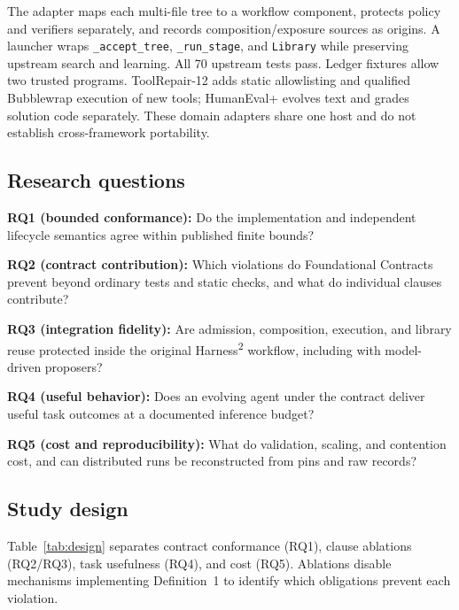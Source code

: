 \documentclass[letterpaper,journal]{IEEEtran}
\newcommand{\harness}{Harness\textsuperscript{2}}
\begin{document}
The adapter maps each multi-file tree to a workflow component, protects policy and verifiers separately, and records composition/exposure sources as origins. A launcher wraps \texttt{\_accept\_tree}, \texttt{\_run\_stage}, and \texttt{Library} while preserving upstream search and learning. All 70 upstream tests pass. Ledger fixtures allow two trusted programs. ToolRepair-12 adds static allowlisting and qualified Bubblewrap execution of new tools; HumanEval+ evolves text and grades solution code separately. These domain adapters share one host and do not establish cross-framework portability.

\subsection{Research questions}
\textbf{RQ1 (bounded conformance):} Do the implementation and independent lifecycle semantics agree within published finite bounds?
\par\noindent\textbf{RQ2 (contract contribution):} Which violations do Foundational Contracts prevent beyond ordinary tests and static checks, and what do individual clauses contribute?
\par\noindent\textbf{RQ3 (integration fidelity):} Are admission, composition, execution, and library reuse protected inside the original \harness{} workflow, including with model-driven proposers?
\par\noindent\textbf{RQ4 (useful behavior):} Does an evolving agent under the contract deliver useful task outcomes at a documented inference budget?
\par\noindent\textbf{RQ5 (cost and reproducibility):} What do validation, scaling, and contention cost, and can distributed runs be reconstructed from pins and raw records?

\subsection{Study design}\label{sec:design}
Table~\ref{tab:design} separates contract conformance (RQ1), clause ablations (RQ2/RQ3), task usefulness (RQ4), and cost (RQ5). Ablations disable mechanisms implementing Definition~1 to identify which obligations prevent each violation.
\end{document}
